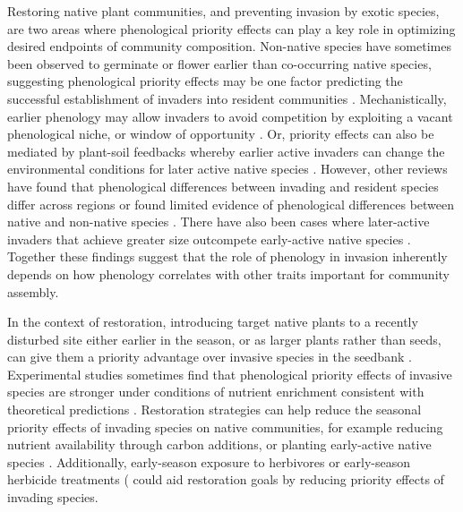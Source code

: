 \documentclass[11pt]{article}
\begin{document}
Restoring native plant communities, and preventing invasion by exotic species, are two areas where phenological priority effects can play a key role in optimizing desired endpoints of community composition. Non-native species have sometimes been observed to germinate \citep{wainwright2012seasonal,wilsey2011biodiversity,marushia2010phenology} or flower \citep{cleland2013strengthening} earlier than co-occurring native species, suggesting phenological priority effects may be one factor predicting the successful establishment of invaders into resident communities \citep{wolkovich2011phenology,alexander2019earlier}. Mechanistically, earlier phenology may allow invaders to avoid competition by exploiting a vacant phenological niche, or window of opportunity \citep{gioria2014resource}. Or, priority effects can also be mediated by plant-soil feedbacks whereby earlier active invaders can change the environmental conditions for later active native species \citep{grman2010within}. However, other reviews have found that phenological differences between invading and resident species differ across regions \citep{godoy2009flowering} or found limited evidence of phenological differences between native and non-native species \citep{zettlemoyer2022limited}. There have also been cases where later-active invaders that achieve greater size outcompete early-active native species \citep{godoy2014}. Together these findings suggest that the role of phenology in invasion inherently depends on how phenology correlates with other traits important for community assembly.

In the context of restoration, introducing target native plants to a recently disturbed site either earlier in the season, or as larger plants rather than seeds, can give them a priority advantage over invasive species in the seedbank \citep{young2017using,wilsey2021restoration}. Experimental studies sometimes find that phenological priority effects of invasive species are stronger under conditions of nutrient enrichment \citep{kardol2013resource,valliere2022phenological}  consistent with theoretical predictions \citep{vannette2014historical}.  Restoration strategies can help reduce the seasonal priority effects of invading species on native communities, for example reducing nutrient availability through carbon additions, or planting early-active native species \citep{cleland2013strengthening,hess2019priority}. Additionally, early-season exposure to herbivores \citep{waterton2016trade} or early-season herbicide treatments (\cite{marushia2010phenology} could aid restoration goals by reducing priority effects of invading species.
\end{document}
